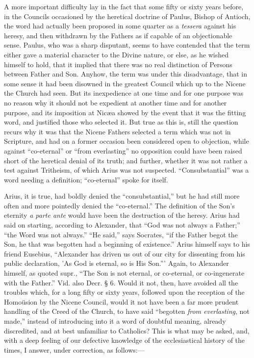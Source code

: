 A
more important difficulty lay in the fact that some fifty or sixty
years before, in the Councils occasioned by the heretical doctrine of
Paulus, Bishop of Antioch, the word had actually been proposed in some
quarter as a \emph{tessera} against his heresy, and then withdrawn by
the Fathers as if capable of an objectionable sense. Paulus, who was a
sharp disputant, seems to have contended that the term either gave a
material character to the Divine nature, or else, as he wished himself
to hold, that it implied that there was no real distinction of Persons
between Father and Son. Anyhow, the term was under this disadvantage,
that in some sense it had been disowned in the greatest Council which
up to the Nicene the Church had seen. But its inexpedience at one time
and for one purpose was no reason why it should not be expedient at
another time and for another purpose, and its imposition at Nicæa
showed by the event that it was the fitting word, and justified those
who selected it. But true as this is, still the question recurs why it
was that the Nicene Fathers selected a term which was not in
Scripture, and had on a former occasion been considered open to
objection, while against ``co-eternal'' or ``from everlasting'' no
opposition could have been raised short of the heretical denial of its
truth; and further, whether it was not rather a test against Tritheism,
of which Arius was not suspected. ``Consubstantial'' was a word needing
a definition; ``co-eternal'' spoke for itself.

Arius,
it is true, had boldly denied the ``consubstantial,'' but he had still
more often and more pointedly denied the ``co-eternal.'' The definition
of the Son's eternity \emph{a parte ante} would have been the
destruction of the heresy. Arius had said on starting, according to
Alexander, that ``God was not always a Father;'' ``the Word was not
always.'' ``He said,'' says Socrates, ``if the Father begot the Son, he
that was begotten had a beginning of existence.'' Arius himself says to
his friend Eusebius, ``Alexander has driven us out of our city for
dissenting from his public declaration, 'As God is eternal, so is His
Son.''' Again, to Alexander himself, as quoted supr., ``The Son is not
eternal, or co-eternal, or co-ingenerate with the Father.'' Vid. also
Decr. § 6. Would it not, then, have avoided all the troubles which,
for a long fifty or sixty years, followed upon the reception of the
Homoüsion by the Nicene Council, would it not have been a far more
prudent handling of the Creed of the Church, to have said ``begotten \emph{from
everlasting}, not made,'' instead of introducing into it a
word of doubtful meaning, already discredited, and at best unfamiliar
to Catholics? This is what may be asked, and, with a deep feeling of
our defective knowledge of the ecclesiastical history of the times, I
answer, under correction, as follows:—

